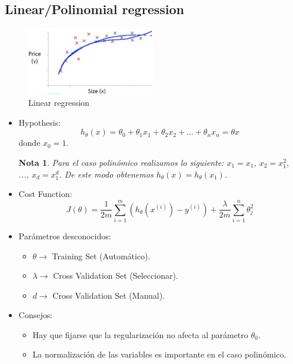 \documentclass[12pt,a4paper]{article}
\newtheorem{nota}{Nota}[subsection]
\begin{document}
\subsection{Linear/Polinomial regression}
\begin{figure}[htb]
\center
\includegraphics[width=0.5\textwidth]{linear_regresion}
\caption{Linear regression}
\end{figure}
\begin{itemize}
\item Hypothesis:
\begin{equation*}
h_\theta(x) = \theta_0 + \theta_1 x_1 + \theta_2 x_2 + ... + \theta_n x_n = \theta x 
\end{equation*}
donde $x_0=1$.
\begin{nota}
Para el caso polinómico realizamos lo siguiente: $x_1=x_1$, $x_2=x_1^2$, ..., $x_d=x_1^d$. De este modo obtenemos $h_\theta(x)=h_\theta(x_1)$.
\end{nota}
\item Cost Function:
\begin{equation*}
J(\theta)=\dfrac{1}{2 m} \sum_{i=1}^{m} (h_\theta(x^{(i)})-y^{(i)})+ \dfrac{\lambda}{2m} \sum_{i=1}^{n}\theta^{2}_j 
\end{equation*}
\item Parámetros desconocidos:
\begin{itemize}
\item $\theta \longrightarrow$ Training Set (Automático).
\item $\lambda \longrightarrow$ Cross Validation Set (Seleccionar).
\item $d  \longrightarrow$ Cross Validation Set (Manual).
\end{itemize}
\item Consejos:
\begin{itemize}
\item Hay que fijarse que la regularización no afecta al parámetro $\theta_0$.
\item La normalización de las variables es importante en el caso polinómico. 
\end{itemize}
\end{itemize}
\end{document}
